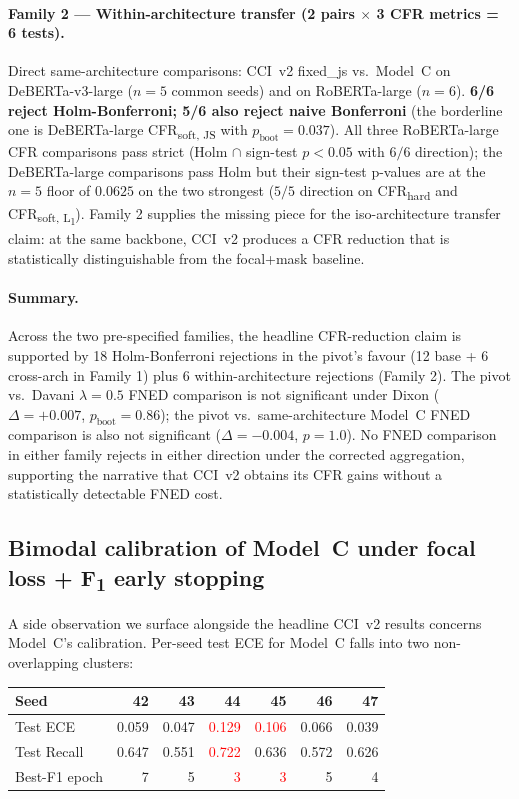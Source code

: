 \documentclass[10pt,a4paper]{article}
\begin{document}
\paragraph{Family 2 — Within-architecture transfer (2 pairs $\times$ 3 CFR metrics = 6 tests).}
Direct same-architecture comparisons: CCI~v2 fixed\_js vs.\ Model~C on DeBERTa-v3-large ($n=5$ common seeds) and on RoBERTa-large ($n=6$). \textbf{6/6 reject Holm-Bonferroni; 5/6 also reject naive Bonferroni} (the borderline one is DeBERTa-large CFR\textsubscript{soft, JS} with $p_{\text{boot}} = 0.037$). All three RoBERTa-large CFR comparisons pass strict (Holm $\cap$ sign-test $p < 0.05$ with $6/6$ direction); the DeBERTa-large comparisons pass Holm but their sign-test p-values are at the $n=5$ floor of $0.0625$ on the two strongest ($5/5$ direction on CFR\textsubscript{hard} and CFR\textsubscript{soft, L\textsubscript{1}}). Family 2 supplies the missing piece for the iso-architecture transfer claim: at the same backbone, CCI~v2 produces a CFR reduction that is statistically distinguishable from the focal+mask baseline.

\paragraph{Summary.}
Across the two pre-specified families, the headline CFR-reduction claim is supported by 18 Holm-Bonferroni rejections in the pivot's favour (12 base + 6 cross-arch in Family 1) plus 6 within-architecture rejections (Family 2). The pivot vs.\ Davani $\lambda{=}0.5$ FNED comparison is not significant under Dixon ($\Delta = +0.007$, $p_{\text{boot}} = 0.86$); the pivot vs.\ same-architecture Model~C FNED comparison is also not significant ($\Delta = -0.004$, $p = 1.0$). No FNED comparison in either family rejects in either direction under the corrected aggregation, supporting the narrative that CCI~v2 obtains its CFR gains without a statistically detectable FNED cost.

\subsection{Bimodal calibration of Model~C under focal loss + F\textsubscript{1} early stopping}
\label{sec:bimodality}

A side observation we surface alongside the headline CCI~v2 results concerns Model~C's calibration. Per-seed test ECE for Model~C falls into two non-overlapping clusters:

\begin{table}[H]
\centering
\small
\begin{tabular}{lrrrrrr}
\toprule
Seed & 42 & 43 & 44 & 45 & 46 & 47 \\
\midrule
Test ECE      & 0.059 & 0.047 & \textcolor{red}{0.129} & \textcolor{red}{0.106} & 0.066 & 0.039 \\
Test Recall   & 0.647 & 0.551 & \textcolor{red}{0.722} & 0.636 & 0.572 & 0.626 \\
Best-F1 epoch & 7 & 5 & \textcolor{red}{3} & \textcolor{red}{3} & 5 & 4 \\
\bottomrule
\end{tabular}
\end{table}
\end{document}
